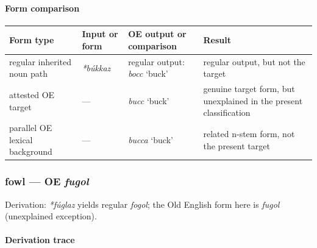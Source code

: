 \documentclass[
  british,
  a4paper,
]{article}
\newcounter{none} %
\begin{document}
\paragraph{Form comparison}\label{form-comparison-7}

{\def\LTcaptype{none} %
\begin{longtable}[]{@{}
  >{\raggedright\arraybackslash}p{}
  >{\raggedright\arraybackslash}p{}
  >{\raggedright\arraybackslash}p{}
  >{\raggedright\arraybackslash}p{}@{}}
\toprule\noalign{}
\begin{minipage}[b]{\linewidth}\raggedright
Form type
\end{minipage} & \begin{minipage}[b]{\linewidth}\raggedright
Input or form
\end{minipage} & \begin{minipage}[b]{\linewidth}\raggedright
OE output or comparison
\end{minipage} & \begin{minipage}[b]{\linewidth}\raggedright
Result
\end{minipage} \\
\midrule\noalign{}
\endhead
\bottomrule\noalign{}
\endlastfoot
regular inherited noun path & {\emph{*búkkaz}} & regular output:
{\emph{bocc}} `buck' & regular output, but not the target \\
attested OE target & --- & {\emph{bucc}} `buck' & genuine target form,
but unexplained in the present classification \\
parallel OE lexical background & --- & {\emph{bucca}} `buck' & related
n-stem form, not the present target \\
\end{longtable}
}

\subsubsection{\texorpdfstring{fowl --- OE
\emph{fugol}}{fowl --- OE fugol}}\label{fowl-oe-fugol}

Derivation: \emph{*fúglaz} yields regular \emph{fogol}; the Old English
form here is \emph{fugol} (unexplained exception).

\paragraph{Derivation trace}\label{derivation-trace-156}
\end{document}

